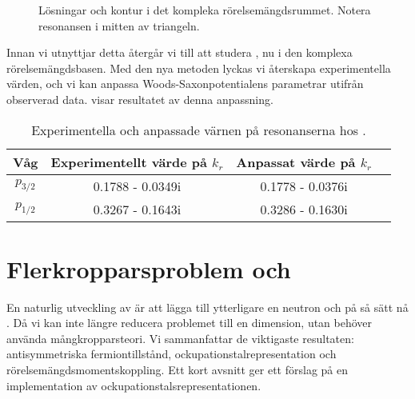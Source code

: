 \documentclass[12pt,a4paper]{article}
\begin{document}
\begin{figure}[h]
   \caption{Lösningar och kontur i det kompleka rörelsemängdsrummet. Notera resonansen i mitten av triangeln.} 
\label{fig:berggren_contour}  
\end{figure}

Innan vi utnyttjar detta återgår vi till att studera , nu i den komplexa rörelsemängdsbasen. Med den nya metoden lyckas vi återskapa experimentella värden, och vi kan anpassa Woods-Saxonpotentialens parametrar utifrån observerad data.  visar resultatet av denna anpassning.

\begin{table}[b]
\caption{Experimentella och anpassade värnen på resonanserna hos .}
\begin{center}
  \label{tab:resonances}
   \begin{tabular}{c|c|c|c}
    Våg      & Experimentellt värde på $k_r$ & Anpassat värde på $k_r$  \\
    \hline
    $p_{3/2}$ & 0.1788 -  0.0349i & 0.1778 - 0.0376i \\
    $p_{1/2}$ & 0.3267 - 0.1643i & 0.3286 - 0.1630i \\
  \end{tabular}
  \end{center}
\end{table}

\section{Flerkropparsproblem och }
En naturlig utveckling av  är att lägga till ytterligare en neutron och på så sätt nå . 
Då vi kan inte längre reducera problemet till en dimension, utan behöver använda mångkropparsteori.
Vi sammanfattar de viktigaste resultaten: antisymmetriska fermiontillstånd, ockupationstalrepresentation och rörelsemängdsmomentskoppling.
Ett kort avsnitt ger ett förslag på en implementation av ockupationstalsrepresentationen.
\end{document}
